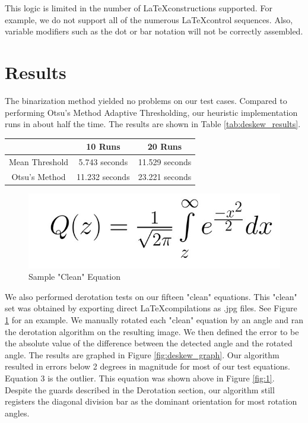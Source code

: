 \documentclass[journal]{IEEEtran}
\begin{document}
This logic is limited in the number of \LaTeX constructions supported. For example, we do not support all of the numerous \LaTeX control sequences. Also, variable modifiers such as the dot or bar notation will not be correctly assembled.

\section{Results}
The binarization method yielded no problems on our test cases. Compared to performing Otsu’s Method Adaptive Thresholding, our heuristic implementation runs in about half the time. The results are shown in Table \ref{tab:deskew_results}.
\begin{center}
\begin{minipage}{\columnwidth}
     \label{tab:deskew_results} 
    \centering
    \begin{tabular}{|c|c|c|}
        \hline
        & 10 Runs &	20 Runs \\
        \hline
         Mean Threshold &	5.743 seconds &	11.529 seconds\\
        \hline
        Otsu’s Method	& 11.232 seconds &23.221 seconds\\
        \hline
    \end{tabular}    
\end{minipage}
\end{center}

\begin{figure}[!t]
    \centering
    \includegraphics[width=\columnwidth]{clean}
    \caption{Sample "Clean" Equation}
    \label{fig:clean}
\end{figure}

We also performed derotation tests on our fifteen "clean" equations. This "clean" set was obtained by exporting direct \LaTeX compilations as .jpg files. See Figure \ref{fig:clean} for an example. We manually rotated each "clean" equation by an angle and ran the derotation algorithm on the resulting image. We then defined the error to be the absolute value of the difference between the detected angle and the rotated angle. The results are graphed in Figure \ref{fig:deskew_graph}. Our algorithm resulted in errors below 2 degrees in magnitude for most of our test equations. Equation 3 is the outlier. This equation was shown above in Figure \ref{fig:1}. Despite the guards described in the Derotation section, our algorithm still registers the diagonal division bar as the dominant orientation for most rotation angles.
\end{document}
